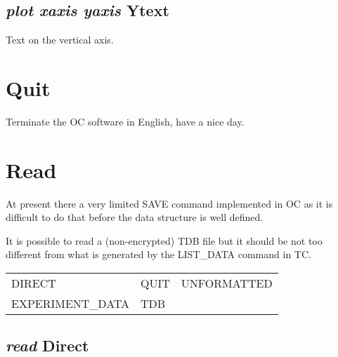\documentclass[12pt]{article}
\begin{document}
\subsection{{\em plot xaxis yaxis} Ytext}

Text on the vertical axis.

\section{Quit }

Terminate the OC software in English, have a nice day.

\section{Read }

At present there a very limited SAVE command implemented in OC as it
is difficult to do that before the data structure is well defined.

It is possible to read a (non-encrypted) TDB file but it should be not
too different from what is generated by the LIST\_DATA command in TC.

\begin{tabular}{lll}
 DIRECT          & QUIT    &         UNFORMATTED\\
 EXPERIMENT\_DATA & TDB\\
\end{tabular}

\subsection{{\em read} Direct}
\end{document}
